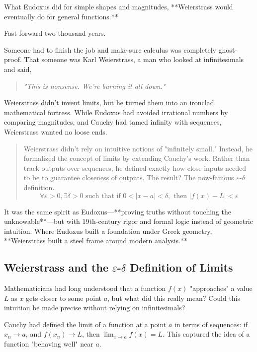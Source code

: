 What Eudoxus did for simple shapes and magnitudes, **Weierstrass would eventually do for general functions.**

Fast forward two thousand years.

Someone had to finish the job and make sure calculus was completely ghost-proof. That someone was Karl Weierstrass, a man who looked at infinitesimals and said,  

\begin{quote}
    \textit{"This is nonsense. We're burning it all down."}
\end{quote}

Weierstrass didn’t invent limits, but he turned them into an ironclad mathematical fortress. While Eudoxus had avoided irrational numbers by comparing magnitudes, and Cauchy had tamed infinity with sequences, Weierstrass wanted no loose ends.

\begin{quote}
Weierstrass didn’t rely on intuitive notions of "infinitely small." Instead, he formalized the concept of limits by extending Cauchy’s work. Rather than track outputs over sequences, he defined exactly how close inputs needed to be to guarantee closeness of outputs. The result? The now-famous \(\varepsilon\)-\(\delta\) definition.
\[
\forall \varepsilon > 0, \exists \delta > 0 \text{ such that if } 0 < |x - a| < \delta, \text{ then } |f(x) - L| < \varepsilon
\]
\end{quote}

It was the same spirit as Eudoxus—**proving truths without touching the unknowable**—but with 19th-century rigor and formal logic instead of geometric intuition.  
Where Eudoxus built a foundation under Greek geometry, **Weierstrass built a steel frame around modern analysis.**





\subsection{Weierstrass and the \(\varepsilon\)-\(\delta\) Definition of Limits}

Mathematicians had long understood that a function \( f(x) \) "approaches" a value \( L \) as \( x \) gets closer to some point \( a \), but what did this really mean? Could this intuition be made precise without relying on infinitesimals?

Cauchy had defined the limit of a function at a point \( a \) in terms of sequences: if \( x_n \to a \), and \( f(x_n) \to L \), then \( \lim_{x \to a} f(x) = L \). This captured the idea of a function "behaving well" near \( a \).

